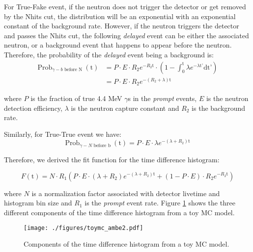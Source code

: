 \documentclass[a4paper]{jpconf}
\begin{document}
For True-Fake event, if the neutron does not trigger the detector or get removed by the Nhits cut, the distribution will be an exponential with an exponential constant of the background rate. However, if the neutron triggers the detector and passes the Nhits cut, the following \textit{delayed} event can be either the associated neutron, or a background event that happens to appear before the neutron. Therefore, the probability of the \textit{delayed} event being a background is:
\begin{equation}
\begin{aligned}
\textrm{Prob}_{\gamma - b\textrm{ before N }}(\textrm{t}) & = P \cdot E \cdot R_{2} e^{-R_{2}\textrm{t}} \cdot (1- \int_0^{\textrm{t}} \lambda e^{-\lambda \textrm{t'}}\textrm{dt'}) \\
& = P \cdot E \cdot R_{2} e^{-(R_{2}+\lambda)\textrm{t}}
\end{aligned}
\end{equation}

where $P$ is the fraction of true 4.4 MeV $\gamma$s in the \textit{prompt} events, $E$ is the neutron detection efficiency, $\lambda$ is the neutron capture constant and $R_2$ is the background rate.

Similarly, for True-True event we have:
\begin{equation}
\textrm{Prob}_{\gamma - N\textrm{ before b }}(\textrm{t}) = P \cdot E \cdot \lambda e^{-(\lambda+R_{2})\textrm{t}}
\end{equation}

Therefore, we derived the fit function for the time difference histogram:

\begin{equation}
F(\textrm{t}) = N \cdot R_{1} (P \cdot E \cdot (\lambda+R_{2}) e^{-(\lambda+R_{2}) \textrm{t}} + (1-P \cdot E) \cdot R_{2} e^{-R_{2} \textrm{t}})
\end{equation}

where $N$ is a normalization factor associated with detector livetime and histogram bin size and $R_{1}$ is the \textit{prompt} event rate. Figure \ref{fig:2} shows the three different components of the time difference histogram from a toy MC model.

\begin{figure}[h]
\begin{center}
\texttt{[image: ./figures/toymc\_ambe2.pdf]}
\end{center}
\caption{\label{fig:2}Components of the time difference histogram from a toy MC model.}
\end{figure}
\end{document}
